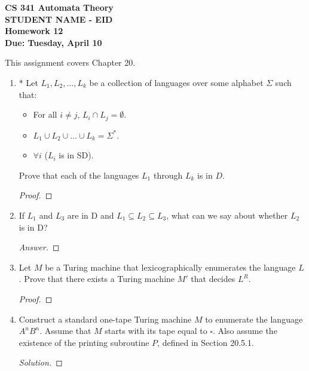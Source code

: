 \documentclass[10pt]{article}
\begin{document}
\begin{flushleft}
\textbf{\noindent
CS 341 Automata Theory \\
STUDENT NAME - EID\\
Homework 12 \\
Due: Tuesday, April 10}\\
\end{flushleft}
\noindent
This assignment covers Chapter 20.\\

\begin{enumerate}[1)]


\item
* Let $L_1, L_2, \ldots , L_k$ be a collection of languages over some alphabet $\Sigma$ such that:
\begin{itemize}
\item
For all $i \neq j$, $L_i \cap L_j = \emptyset$.
\item
$L_1 \cup L_2 \cup \dots \cup L_k = \Sigma ^*$.
\item
$\forall i$ ($L_i$ is in SD).
\end{itemize}
Prove that each of the languages $L_1$ through $L_k$ is in $D$.
\begin{proof}[Proof]
\end{proof}


\item
If $L_1$ and $L_3$ are in D and $L_1 \subseteq L_2 \subseteq L_3$, what can we say about whether $L_2$ is in D?
\begin{proof}[Answer]
\end{proof}


\item
Let $M$ be a Turing machine that lexicographically enumerates the language $L$. Prove that there exists a Turing
machine $M'$ that decides $L^R$.
\begin{proof}[Proof]
\end{proof}



\item
Construct a standard one-tape Turing machine $M$ to enumerate the language $A^nB^n$. Assume that $M$ starts with
its tape equal to $\square$. Also assume the existence of the printing subroutine $P$, defined in Section 20.5.1.
\begin{proof}[Solution]
\end{proof}



\end{enumerate}
\end{document}
